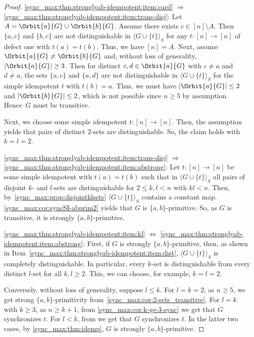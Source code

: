 \begin{proof}
\ref{sync_max:thm:stronglyab-idempotent:item:card} $\Rightarrow$ \ref{sync_max:thm:stronglyab-idempotent:item:trans-disj}:
 Let $A = \Orbit{a}{G} \cup \Orbit{b}{G}$.
 Assume there exists $c \in [n] \setminus A$.
 Then $\{a,c\}$ and $\{b,c\}$ are not distinguishable
 in $\langle G \cup \{t\} \rangle_S$ for any $t \colon [n] \to [n]$
 of defect one with $t(a) = t(b)$.
 Thus, we have $[n] = A$.
 Next, assume $\Orbit{a}{G} \ne \Orbit{b}{G}$
 and, without loss of generality, $|\Orbit{a}{G}| \ge 3$.
 Then for distinct $c,d \in \Orbit{a}{G}$ with $c \ne a$ and $d \ne a$,
 the sets $\{a,c\}$ and $\{a,d\}$ are not distinguishable
 in $\langle G \cup \{t\} \rangle_S$
 for the simple idempotent $t$ with $t(b) = a$.
 Thus, we must have $|\Orbit{a}{G}| \le 2$
 and $|\Orbit{b}{G}| \le 2$,
 which is not possible since $n \ge 5$ by assumption.
 Hence~$G$ must be transitive.
 
 Next, we choose some simple idempotent $t \colon [n] \to [n]$. Then, the assumption yields that pairs of distinct $2$-sets
 are distinguishable. So, the claim holds with $k = l = 2$.
 
\ref{sync_max:thm:stronglyab-idempotent:item:trans-disj} $\Rightarrow$ \ref{sync_max:thm:stronglyab-idempotent:item:abstrong}: 
Let $t \colon [n] \to [n]$ be some simple idempotent
with $t(a) = t(b)$ such that in $\langle G \cup \{t\} \rangle_S$
all pairs of disjoint $k$- and $l$-sets are distinguishable
for $2 \le k,l < n$ with $kl < n$. 
Then, by~\cref{sync_max:prop:disjointklsets}
$\langle G \cup \{t\} \rangle_S$ contains a constant map.
\cref{sync_max:cor:syncSI-abprim2}
yields that $G$ is $\{a,b\}$-primitive. So, as $G$ is transitive,
it is strongly $\{a,b\}$-primitive.	

\ref{sync_max:thm:stronglyab-idempotent:item:kl} $\Leftrightarrow$ \ref{sync_max:thm:stronglyab-idempotent:item:abstrong}:  
First, if $G$ is strongly $\{a,b\}$-primitive, then, as shown in Item~\ref{sync_max:thm:stronglyab-idempotent:item:dist},
$\langle G \cup \{t\} \rangle_S$ is completely distinguishable. 
 In particular,
every $k$-set is distinguishable from every distinct $l$-set
for all $k,l \ge 2$.
This, we can choose, for example, $k = l = 2$.

Conversely, without loss of generality, suppose $l \le k$.
For $l = k = 2$,
as $n \ge 5$,
we get strong $\{a,b\}$-primitivity from~\cref{sync_max:cor:2-sets_transitive}.
For $l = k$ with $k \ge 3$,
as $n \ge k + 1$, from \cref{sync_max:cor:k-ge-3-sync}
we get that $G$ synchronizes $t$.
For $l < k$, from 
we get that $G$ synchronizes $t$.
In the latter two cases,
by \cref{sync_max:thm:idemp}, $G$ is strongly $\{a,b\}$-primitive.


\end{proof}
